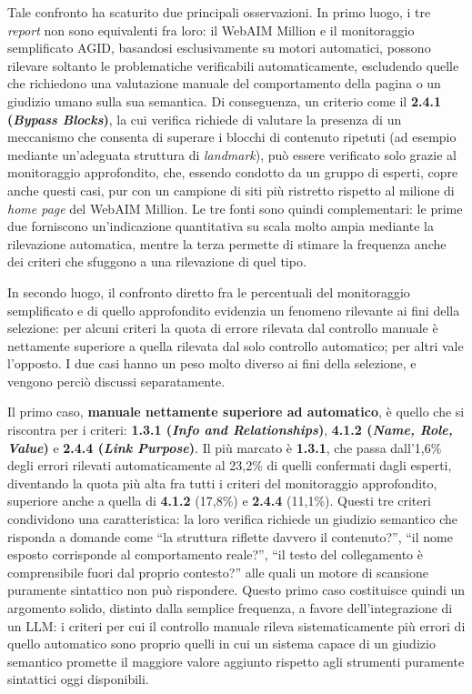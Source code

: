 Tale confronto ha scaturito due principali osservazioni. In primo luogo, i tre \emph{report} non sono equivalenti fra loro: il WebAIM Million e il monitoraggio semplificato AGID, basandosi esclusivamente su motori automatici, possono rilevare soltanto le problematiche verificabili automaticamente, escludendo quelle che richiedono una valutazione manuale del comportamento della pagina o un giudizio umano sulla sua semantica. Di conseguenza, un criterio come il \textbf{2.4.1 (\emph{Bypass Blocks})}, la cui verifica richiede di valutare la presenza di un meccanismo che consenta di superare i blocchi di contenuto ripetuti (ad esempio mediante un'adeguata struttura di \emph{landmark}), può essere verificato solo grazie al monitoraggio approfondito, che, essendo condotto da un gruppo di esperti, copre anche questi casi, pur con un campione di siti più ristretto rispetto al milione di \emph{home page} del WebAIM Million. Le tre fonti sono quindi complementari: le prime due forniscono un'indicazione quantitativa su scala molto ampia mediante la rilevazione automatica, mentre la terza permette di stimare la frequenza anche dei criteri che sfuggono a una rilevazione di quel tipo.

In secondo luogo, il confronto diretto fra le percentuali del monitoraggio semplificato e di quello approfondito evidenzia un fenomeno rilevante ai fini della selezione: per alcuni criteri la quota di errore rilevata dal controllo manuale è nettamente superiore a quella rilevata dal solo controllo automatico; per altri vale l'opposto. I due casi hanno un peso molto diverso ai fini della selezione, e vengono perciò discussi separatamente.

Il primo caso, \textbf{manuale nettamente superiore ad automatico}, è quello che si riscontra per i criteri: \textbf{1.3.1 (\emph{Info and Relationships})}, \textbf{4.1.2 (\emph{Name, Role, Value})} e \textbf{2.4.4 (\emph{Link Purpose})}. Il più marcato è \textbf{1.3.1}, che passa dall'1,6\% degli errori rilevati automaticamente al 23,2\% di quelli confermati dagli esperti, diventando la quota più alta fra tutti i criteri del monitoraggio approfondito, superiore anche a quella di \textbf{4.1.2} (17,8\%) e \textbf{2.4.4} (11,1\%). Questi tre criteri condividono una caratteristica: la loro verifica richiede un giudizio semantico che risponda a domande come “la struttura riflette davvero il contenuto?”, “il nome esposto corrisponde al comportamento reale?”, “il testo del collegamento è comprensibile fuori dal proprio contesto?” alle quali un motore di scansione puramente sintattico non può rispondere. Questo primo caso costituisce quindi un argomento solido, distinto dalla semplice frequenza, a favore dell'integrazione di un LLM: i criteri per cui il controllo manuale rileva sistematicamente più errori di quello automatico sono proprio quelli in cui un sistema capace di un giudizio semantico promette il maggiore valore aggiunto rispetto agli strumenti puramente sintattici oggi disponibili.
    
